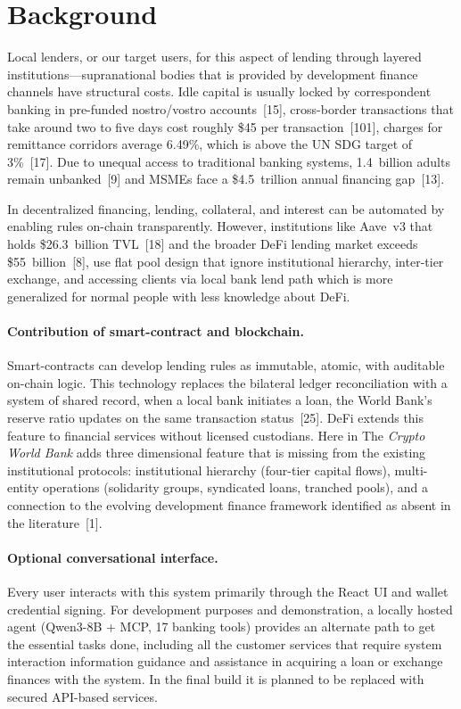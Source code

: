 \section{Background}
\label{sec:background}

Local lenders, or our target users, for this aspect of lending through layered institutions---supranational bodies that is provided by development finance channels have structural costs. Idle capital is usually locked by correspondent banking in pre-funded nostro/vostro accounts~[15], cross-border transactions that take around two to five days cost roughly \$45 per transaction~[101], charges for remittance corridors average 6.49\%, which is above the UN SDG target of 3\%~[17]. Due to unequal access to traditional banking systems, 1.4~billion adults remain unbanked~[9] and MSMEs face a \$4.5~trillion annual financing gap~[13].

In decentralized financing, lending, collateral, and interest can be automated by enabling rules on-chain transparently. However, institutions like Aave~v3 that holds \$26.3~billion TVL~[18] and the broader DeFi lending market exceeds \$55~billion~[8], use flat pool design that ignore institutional hierarchy, inter-tier exchange, and accessing clients via local bank lend path which is more generalized for normal people with less knowledge about DeFi.

\paragraph{Contribution of smart-contract and blockchain.}
Smart-contracts can develop lending rules as immutable, atomic, with auditable on-chain logic. This technology replaces the bilateral ledger reconciliation with a system of shared record, when a local bank initiates a loan, the World Bank's reserve ratio updates on the same transaction status~[25]. DeFi extends this feature to financial services without licensed custodians. Here in The \textit{Crypto World Bank} adds three dimensional feature that is missing from the existing institutional protocols: institutional hierarchy (four-tier capital flows), multi-entity operations (solidarity groups, syndicated loans, tranched pools), and a connection to the evolving development finance framework identified as absent in the literature~[1].

\paragraph{Optional conversational interface.}
Every user interacts with this system primarily through the React UI and wallet credential signing. For development purposes and demonstration, a locally hosted agent (Qwen3-8B + MCP, 17 banking tools) provides an alternate path to get the essential tasks done, including all the customer services that require system interaction information guidance and assistance in acquiring a loan or exchange finances with the system. In the final build it is planned to be replaced with secured API-based services.

